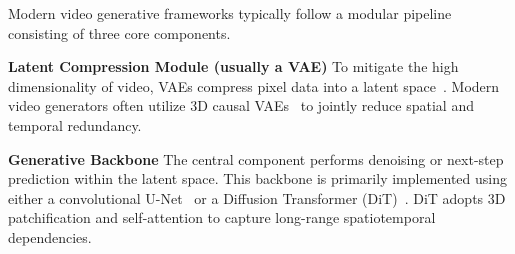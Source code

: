\documentclass[lettersize,journal]{IEEEtran}
\begin{document}

Modern video generative frameworks typically follow a modular pipeline consisting of three core components.

\noindent \textbf{Latent Compression Module (usually a VAE)} To mitigate the high dimensionality of video, VAEs compress pixel data into a latent space~\cite{rombach2022high}. Modern video generators often utilize {3D causal VAEs}~\cite{yu2023magvit, yang2025cogvideox} to jointly reduce spatial and temporal redundancy.

\noindent \textbf{Generative Backbone} The central component performs denoising or next-step prediction within the latent space. This backbone is primarily implemented using either a convolutional {U-Net}~\cite{ronneberger2015u} or a {Diffusion Transformer (DiT)}~\cite{peebles2023scalable}. DiT adopts 3D patchification and self-attention to capture long-range spatiotemporal dependencies.
\end{document}
